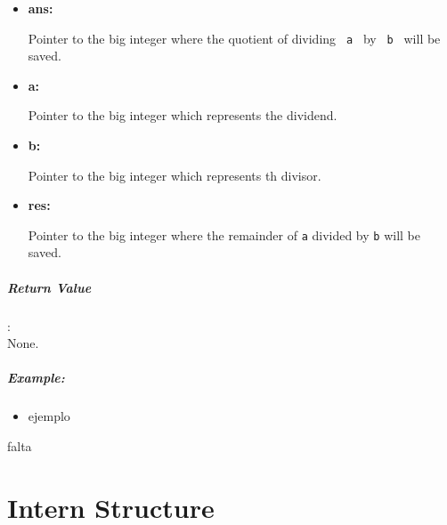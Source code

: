 \documentclass{book}
\begin{document}
\begin{itemize}
\item{\bf ans:}

Pointer to the big integer where the quotient of dividing \verb+ a + by \verb+ b + will be saved.

\item {\bf a:}

Pointer to the big integer which represents the dividend. 

\item {\bf b:}

Pointer to the big integer which represents th divisor.

\item {\bf res:}

Pointer to the big integer where the remainder of \verb+a+ divided by \verb+b+ will be saved. 

\end{itemize}

\paragraph{Return Value}:\\

None.

\paragraph{Example:}

\begin{itemize}
\item
    ejemplo
\end{itemize}

falta


\chapter{Intern Structure}
\end{document}
